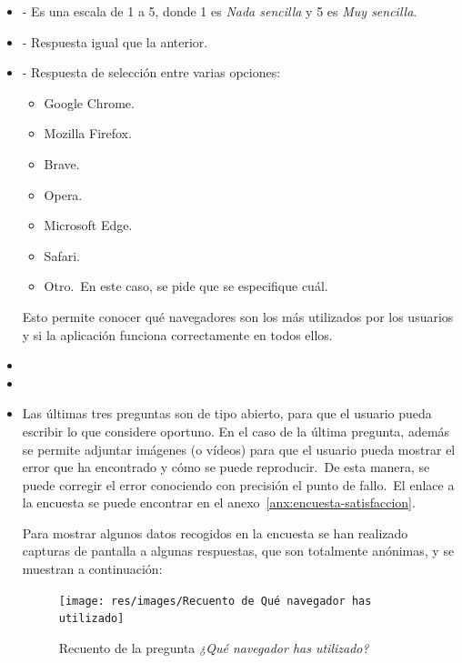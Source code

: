 \begin{itemize}
	\item {} - Es una escala de 1 a 5, donde 1 es
	\textit{Nada sencilla} y 5 es \textit{Muy sencilla}.
	\item {} - Respuesta igual que la anterior.
	\item {} - Respuesta de selección entre varias opciones:
	\begin{itemize}
		\item Google Chrome.
		\item Mozilla Firefox.
		\item Brave.
		\item Opera.
		\item Microsoft Edge.
		\item Safari.
		\item Otro.\ En este caso, se pide que se especifique cuál.
	\end{itemize}
	Esto permite conocer qué navegadores son los más utilizados por los usuarios y si la aplicación funciona
	correctamente en todos ellos.
	\item {}
	\item {}
	\item {}

	Las últimas tres preguntas son de tipo abierto, para que el usuario pueda escribir lo que considere oportuno.
	En el caso de la última pregunta, además se permite adjuntar imágenes (o vídeos) para que el usuario pueda mostrar
	el error que ha encontrado y cómo se puede reproducir.\ De esta manera, se puede corregir el error conociendo
	con precisión el punto de fallo.\ El enlace a la encuesta se puede encontrar en el
	anexo~\ref{anx:encuesta-satisfaccion}.

	Para mostrar algunos datos recogidos en la encuesta se han realizado capturas de pantalla a algunas respuestas,
	que son totalmente anónimas, y se muestran a continuación:

	\begin{figure}[h]
		\centering
		\texttt{[image: res/images/Recuento de Qué navegador has utilizado]}
		\caption{Recuento de la pregunta \textit{¿Qué navegador has utilizado?}}
		\label{fig:recuento-navegador}
	\end{figure}


\end{itemize}
